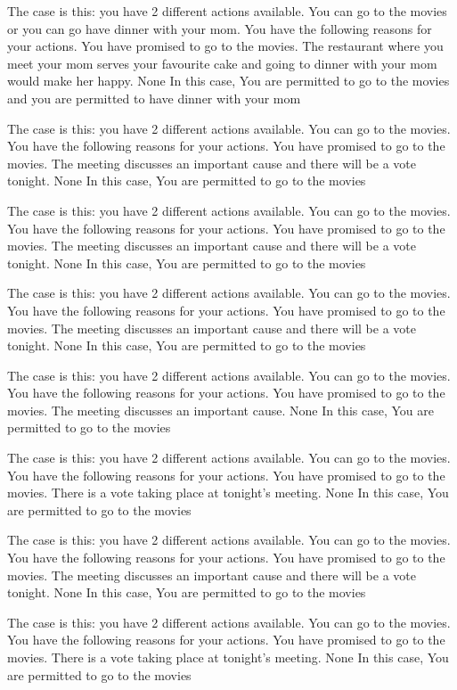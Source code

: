 The case is this: you have  2  different actions available.  You can go to the movies or you can go have dinner with your mom.
You have the following reasons for your actions.  You have promised to go to the movies. The restaurant where you meet your mom serves your favourite cake and going to dinner with your mom would make her happy. 
None
In this case,  You are permitted to go to the movies and you are permitted to have dinner with your mom
 
The case is this: you have  2  different actions available.  You can go to the movies.
You have the following reasons for your actions.  You have promised to go to the movies. The meeting discusses an important cause and there will be a vote tonight. 
None
In this case,  You are permitted to go to the movies
 
The case is this: you have  2  different actions available.  You can go to the movies.
You have the following reasons for your actions.  You have promised to go to the movies. The meeting discusses an important cause and there will be a vote tonight. 
None
In this case,  You are permitted to go to the movies
 
The case is this: you have  2  different actions available.  You can go to the movies.
You have the following reasons for your actions.  You have promised to go to the movies. The meeting discusses an important cause and there will be a vote tonight. 
None
In this case,  You are permitted to go to the movies
 
The case is this: you have  2  different actions available.  You can go to the movies.
You have the following reasons for your actions.  You have promised to go to the movies. The meeting discusses an important cause. 
None
In this case,  You are permitted to go to the movies
 
The case is this: you have  2  different actions available.  You can go to the movies.
You have the following reasons for your actions.  You have promised to go to the movies. There is a vote taking place at tonight's meeting. 
None
In this case,  You are permitted to go to the movies
 
The case is this: you have  2  different actions available.  You can go to the movies.
You have the following reasons for your actions.  You have promised to go to the movies. The meeting discusses an important cause and there will be a vote tonight. 
None
In this case,  You are permitted to go to the movies
 
The case is this: you have  2  different actions available.  You can go to the movies.
You have the following reasons for your actions.  You have promised to go to the movies. There is a vote taking place at tonight's meeting. 
None
In this case,  You are permitted to go to the movies
 
